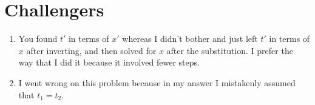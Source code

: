 \documentclass[12pt]{article}
\begin{document}
    \section{Challengers}
    \begin{enumerate}
        \item You found \(t'\) in terms of \(x'\) whereas I didn't bother and just left \(t'\) in terms of \(x\) after inverting, and then solved for \(x\) after the substitution. I prefer the way that I did it because it involved fewer steps.
        \item I went wrong on this problem because in my answer I mistakenly assumed that \(t_1 = t_2\).
    \end{enumerate}
\end{document}
